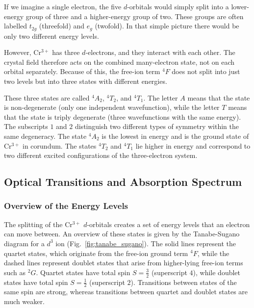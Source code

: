 \documentclass[a4paper]{article}
\begin{document}
If we imagine a single electron, the five $d$-orbitals would simply split into a lower-energy group of three and a higher-energy group of two.
These groups are often labelled $t_{2g}$ (threefold) and $e_{g}$ (twofold).
In that simple picture there would be only two different energy levels.

However, Cr$^{3+}$ has three $d$-electrons, and they interact with each other.
The crystal field therefore acts on the combined many-electron state, not on each orbital separately.
Because of this, the free-ion term ${}^{4}F$ does not split into just two levels but into three states with different energies.

These three states are called ${}^{4}A_{2}$, ${}^{4}T_{2}$, and ${}^{4}T_{1}$.
The letter $A$ means that the state is non-degenerate (only one independent wavefunction), while the letter $T$ means that the state is triply degenerate (three wavefunctions with the same energy).
The subscripts $1$ and $2$ distinguish two different types of symmetry within the same degeneracy.
The state ${}^{4}A_{2}$ is the lowest in energy and is the ground state of Cr$^{3+}$ in corundum.
The states ${}^{4}T_{2}$ and ${}^{4}T_{1}$ lie higher in energy and correspond to two different excited configurations of the three-electron system.


\subsection{Optical Transitions and Absorption Spectrum}

\subsubsection{Overview of the Energy Levels}

The splitting of the Cr$^{3+}$ $d$-orbitals creates a set of energy levels that an electron can move between.
An overview of these states is given by the Tanabe-Sugano diagram for a $d^{3}$ ion (Fig.~\ref{fig:tanabe_sugano}).
The solid lines represent the quartet states, which originate from the free-ion ground term ${}^{4}F$, while the dashed lines represent doublet states that arise from higher-lying free-ion terms such as ${}^{2}G$.
Quartet states have total spin $S=\tfrac{3}{2}$ (superscript $4$), while doublet states have total spin $S=\tfrac{1}{2}$ (superscript $2$).
Transitions between states of the same spin are strong, whereas transitions between quartet and doublet states are much weaker.
\end{document}
